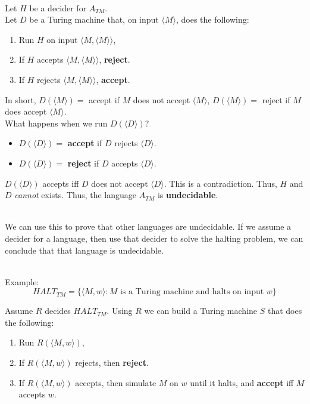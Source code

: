 \documentclass[12pt]{article}
\begin{document}
\noindent
\\
Let $H$ be a decider for $A_{TM}$.\\
Let $D$ be a Turing machine that, on input $\langle M \rangle$, does the following:

\begin{enumerate}
    \item Run $H$ on input $\langle M, \langle M \rangle \rangle$,
    \item If $H$ accepts $\langle M, \langle M \rangle \rangle$, \textbf{reject}.
    \item If $H$ rejects $\langle M, \langle M \rangle \rangle$, \textbf{accept}.
\end{enumerate}

\noindent
In short, $D(\langle M \rangle) = $ accept if $M$ does not accept $\langle M \rangle$,  $D(\langle M \rangle) = $ reject if $M$ does accept $\langle M \rangle$.\\
What happens when we run $D(\langle D \rangle)$?

\begin{itemize}
    \item $D(\langle D \rangle) = $ \textbf{accept} if $D$ rejects $\langle D \rangle$.
    \item $D(\langle D \rangle) = $ \textbf{reject} if $D$ accepts $\langle D \rangle$.
\end{itemize}

\noindent
$D(\langle D \rangle)$ accepts iff $D$ does not accept $\langle D \rangle$.
This is a contradiction.
Thus, $H$ and $D$ \textit{cannot} exists.
Thus, the language $A_{TM}$ is \textbf{undecidable}.

\noindent
\\
We can use this to prove that other languages are undecidable.
If we assume a decider for a language, then use that decider to solve the halting problem, we can conclude that that language is undecidable.

\noindent
\\
Example:
\[ HALT_{TM} = \{\langle M, w \rangle : M \text{ is a Turing machine and halts on input } w\} \]

\noindent
Assume $R$ decides $HALT_{TM}$.
Using $R$ we can build a Turing machine $S$ that does the following:

\begin{enumerate}
    \item Run $R(\langle M, w \rangle)$,
    \item If $R(\langle M, w \rangle)$ rejects, then \textbf{reject}.
    \item If $R(\langle M, w \rangle)$ accepts, then simulate $M$ on $w$ until it halts, and \textbf{accept} iff $M$ accepts $w$.
\end{enumerate}
\end{document}
